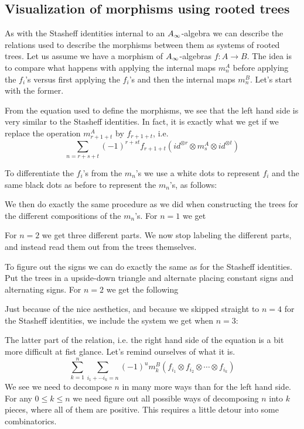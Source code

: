 


\subsection{Visualization of morphisms using rooted trees}

As with the Stasheff identities internal to an $A_{\infty}$-algebra we can describe the relations used to describe the morphisms between them as systems of rooted trees. Let us assume we have a morphism of $A_{\infty}$-algebras $f\colon A\longrightarrow B$. The idea is to compare what happens with applying the internal maps $m_n^A$ before applying the $f_i$'s versus first applying the $f_i$'s and then the internal maps $m_n^B$. Let's start with the former.

From the equation used to define the morphisms, we see that the left hand side is very similar to the Stasheff identities. In fact, it is exactly what we get if we replace the operation $m_{r+1+t}^A$ by $f_{r+1+t}$, i.e. 
\begin{equation*}
    \sum_{n = r+s+t}(-1)^{r+st}f_{r+1+t}(id^{\otimes r}\otimes m_s^A \otimes id^{\otimes t})
\end{equation*}

To differentiate the $f_i$'s from the $m_n$'s we use a white dots to represent $f_i$ and the same black dots as before to represent the $m_n$'s, as follows:


We then do exactly the same procedure as we did when constructing the trees for the different compositions of the $m_n$'s. For $n=1$ we get 


For $n=2$ we get three different parts. We now stop labeling the different parts, and instead read them out from the trees themselves. 


To figure out the signs we can do exactly the same as for the Stasheff identities. Put the trees in a upside-down triangle and alternate placing constant signs and alternating signs. For $n=2$ we get the following


Just because of the nice aesthetics, and because we skipped straight to $n=4$ for the Stasheff identities, we include the system we get when $n=3$:




The latter part of the relation, i.e. the right hand side of the equation is a bit more difficult at fist glance. Let's remind ourselves of what it is.
\begin{equation*}
     \sum_{k=1}^{n}\sum_{i_1+\cdots i_k = n}(-1)^{u} m_k^B(f_{i_1}\otimes f_{i_2}\otimes \cdots \otimes f_{i_k})
\end{equation*}
We see we need to decompose $n$ in many more ways than for the left hand side. For any $0\leq k\leq n$ we need figure out all possible ways of decomposing $n$ into $k$ pieces, where all of them are positive. This requires a little detour into some combinatorics.


